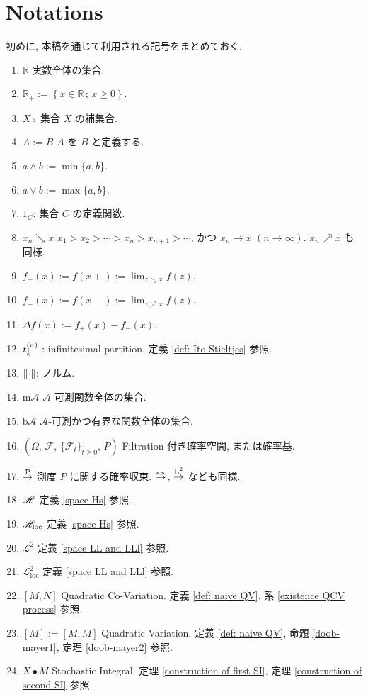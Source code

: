 \documentclass{ltjsarticle}
\begin{document}
\section*{Notations}
初めに, 本稿を通じて利用される記号をまとめておく.
\begin{enumerate}
	\renewcommand{\labelenumi}{\(\diamond\)}
	\item \( \mathbb{R} \) \COLON 実数全体の集合.
	\item \( \mathbb{R}_{+} := \left\{ x \in \mathbb{R} \, ; \, x \ge 0 \right\} \).
	\item \( X\comp \) \COLON 集合 \( X \) の補集合.
	\item \( A := B \) \COLON \( A \) を \( B \) と定義する.
	\item \( a \wedge b := \min \{ a,b \} \).
	\item \( a \vee b := \max \{ a,b \} \).
	\item \( 1_C \)\;:\; 集合 \( C \) の定義関数.
	\item \( x_n \searrow x \) \COLON \( x_1 > x_2 > \cdots > x_n > x_{n+1} > \cdots \), かつ \( x_n \to x \) \( (n \to \infty) \). \( x_n \nearrow x \) も同様.
	\item \( f_{+}( x ) := f( x + ) := \lim_{ z \searrow x } f( z ) \).
	\item \( f_{-}( x ) := f( x - ) := \lim_{ z \nearrow x } f( z ) \).
	\item \( \Delta f( x ) := f_{+}( x ) - f_{-}( x ) \).
	\item \( t_k^{(n)} \) : infinitesimal partition. 定義 \ref{def: Ito-Stieltjes} 参照.
	\item \( \left\| \cdot  \right\| \): ノルム.
	\item \( \text{m}\mathscr{A} \) \COLON \( \mathscr{A} \)-可測関数全体の集合.
	\item \( \text{b}\mathscr{A} \) \COLON \( \mathscr{A} \)-可測かつ有界な関数全体の集合.
	\item \( ( \Omega,\, \mathscr{F},\, \{ \mathscr{F}_t \} _{ t \ge 0 } ,\, P ) \) \COLON Filtration 付き確率空間, または確率基.
	\item \( \stackrel{ \mathrm{P} }{ \to } \) \COLON 測度 \( P \) に関する確率収束. \( \stackrel{ \mathrm{ a.s.} }{ \to } \), \( \stackrel{ \mathrm{L}^2 }{ \to } \) なども同様.
	\item \( \mathscr{H} \) \COLON 定義 \ref{space Hs} 参照.
	\item \( \mathscr{H}_{\mathrm{loc}} \) \COLON 定義 \ref{space Hs} 参照.
	\item \( \mathscr{L}^2 \) \COLON 定義 \ref{space LL and LLl} 参照.
	\item \( \mathscr{L}^2_{\mathrm{loc}} \) \COLON 定義 \ref{space LL and LLl} 参照.
	\item \( [M, N] \) \COLON Quadratic Co-Variation. 定義 \ref{def: naive QV}, 系 \ref{existence QCV process} 参照.
	\item \( [M]:=[M, M] \) \COLON Quadratic Variation. 定義 \ref{def: naive QV}, 命題 \ref{doob-mayer1}, 定理 \ref{doob-mayer2} 参照.
	\item \( X \bullet M \) \COLON Stochastic Integral. 定理 \ref{construction of first SI}, 定理 \ref{construction of second SI} 参照.
\end{enumerate}
\end{document}

